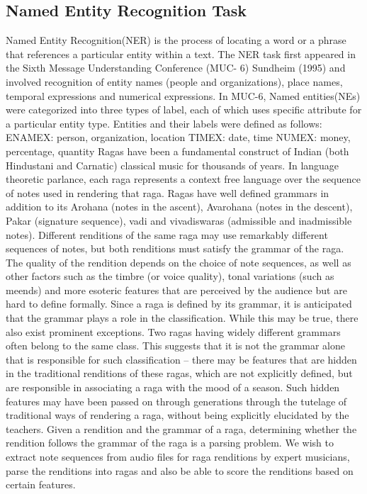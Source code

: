 \documentclass[12pt,a4paper]{article}
\begin{document}
\subsection{Named Entity Recognition Task}
Named Entity Recognition(NER) is the process of locating a word or a phrase that references a particular
entity within a text. The NER task first appeared in the Sixth Message Understanding Conference (MUC-
6) Sundheim (1995) and involved recognition of entity names (people and organizations), place names,
temporal expressions and numerical expressions.
In MUC-6, Named entities(NEs) were categorized into three types of label, each of which uses specific
attribute for a particular entity type. Entities and their labels were defined as follows:
 ENAMEX: person, organization, location
TIMEX: date, time
 NUMEX: money, percentage, quantity
Ragas have been a fundamental construct of Indian (both Hindustani and Carnatic) classical music for thousands of years. In language theoretic parlance, each raga represents a context free language over the sequence of notes used in rendering that raga. Ragas have well defined grammars in addition to its Arohana (notes in the ascent), Avarohana (notes in the descent), Pakar (signature sequence), vadi and vivadiswaras (admissible and inadmissible notes). Different renditions of the same raga may use remarkably different sequences of notes, but both renditions must satisfy the grammar of the raga. The quality of the rendition depends on the choice of note sequences, as well as other factors such as the timbre (or voice quality), tonal variations (such as meends) and more esoteric features that are perceived by the audience but are hard to define formally. Since a raga is defined by its grammar, it is anticipated that the grammar plays a role in the classification. While this may be true, there also exist prominent exceptions. Two ragas having widely different grammars often belong to the same class. This suggests that it is not the grammar alone that is responsible for such classification – there may be features that are hidden in the traditional renditions of these ragas, which are not explicitly defined, but are responsible in associating a raga with the mood of a season. Such hidden features may have been passed on through generations through the tutelage of traditional ways of rendering a raga, without being explicitly elucidated by the teachers.
Given a rendition and the grammar of a raga, determining whether the rendition follows the grammar of the raga is a parsing problem. 
We wish to extract note sequences from audio files for raga renditions by expert musicians, parse the renditions into ragas and also be able to score the renditions based on certain features. \\
\end{document}
